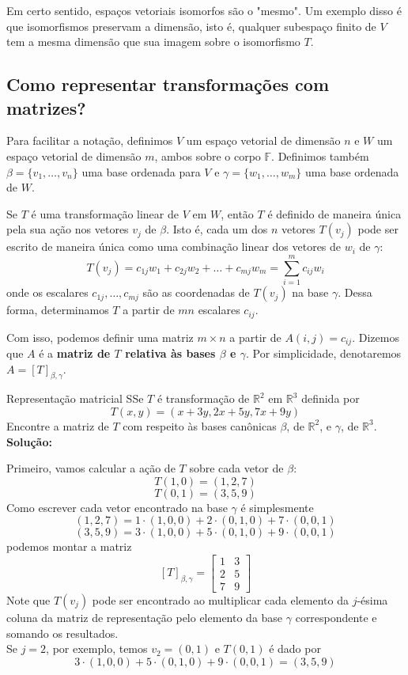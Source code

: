 \documentclass[12pt,a4paper]{article}
\begin{document}
Em certo sentido, espaços vetoriais isomorfos são o "mesmo". Um exemplo disso é que isomorfismos preservam a dimensão, isto é, qualquer subespaço finito de $V$ tem a mesma dimensão que sua imagem sobre o isomorfismo $T$.

\subsection{Como representar transformações com matrizes?}

Para facilitar a notação, definimos $V$ um espaço vetorial de dimensão $n$ e $W$ um espaço vetorial de dimensão $m$, ambos sobre o corpo $\mathbb{F}$. Definimos também $\beta = \{ v_1, \ldots, v_n\}$ uma base ordenada para $V$ e $\gamma = \{ w_1, \ldots, w_m\}$ uma base ordenada de $W$.

Se $T$ é uma transformação linear de $V$ em $W$, então $T$ é definido de maneira única pela sua ação nos vetores $v_j$ de $\beta$. Isto é, cada um dos $n$ vetores $T(v_j)$ pode ser escrito de maneira única como uma combinação linear dos vetores de $w_i$ de $\gamma$:
\[
T(v_j) = c_{1j} w_1 + c_{2j} w_2 + \ldots +  c_{mj} w_m = \sum_{i=1}^m c_{ij} w_i
\]
onde os escalares $c_{1j}, \ldots,c_{mj}$ são as coordenadas de $T(v_j)$ na base $\gamma$. Dessa forma, determinamos $T$ a partir de $mn$ escalares $c_{ij}$. 

Com isso, podemos definir uma matriz $m \times n$ a partir de $A(i,j) = c_{ij}$. Dizemos que $A$ é a \textbf{matriz de $T$ relativa às bases $\beta$ e $\gamma$}. Por simplicidade, denotaremos $A = [T]_{\beta,\gamma}$.

\begin{exemplo}{Representação matricial}
SSe $T$ é transformação de $\mathbb{R}^2$ em $\mathbb{R}^3$ definida por
\[
T(x,y) = (x+3y, 2x+5y,7x+9y)
\]
Encontre a matriz de $T$ com respeito às bases canônicas $\beta$, de $\mathbb{R}^2$, e $\gamma$, de $\mathbb{R}^3$. \\

\textbf{Solução:}

Primeiro, vamos calcular a ação de $T$ sobre cada vetor de $\beta$:
\[
T(1,0) = (1,2,7)
\]
\[
T(0,1) = (3,5,9)
\]
Como escrever cada vetor encontrado na base $\gamma$ é simplesmente
\[
(1,2,7) = 1 \cdot (1,0,0) + 2 \cdot (0,1,0) + 7 \cdot (0,0,1)
\]
\[
(3,5,9) = 3 \cdot (1,0,0) + 5 \cdot (0,1,0) + 9 \cdot (0,0,1)
\]
podemos montar a matriz
\[
[T]_{\beta,\gamma} = 
\begin{bmatrix}
1 & 3 \\
2 & 5 \\
7 & 9
\end{bmatrix}
\]
Note que $T(v_j)$ pode ser encontrado ao multiplicar cada elemento da $j$-ésima coluna da matriz de representação pelo elemento da base $\gamma$ correspondente e somando os resultados.  \\

Se $j = 2$, por exemplo, temos $v_2 = (0,1)$ e $T(0,1)$ é dado por
\[ 3 \cdot (1,0,0) + 5 \cdot (0,1,0) + 9 \cdot (0,0,1) = (3,5,9)\]

\end{exemplo}
\end{document}

